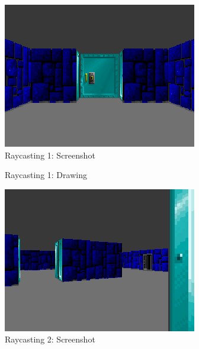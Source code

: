 \begin{minipage}{\linewidth}

\end{minipage}


\begin{figure}[H]
  \centering
 \includegraphics[width=\textwidth]{imgs/ray_caster_explained/beginning.png}
 \caption{Raycasting 1: Screenshot}
\end{figure}

\begin{figure}[H]
  \centering
  
 \caption{Raycasting 1: Drawing} 
\end{figure}




\begin{figure}[H]
  \centering
 \includegraphics[width=\textwidth]{imgs/ray_caster_explained/out_door.png}
 \caption{Raycasting 2: Screenshot} 
\end{figure}

